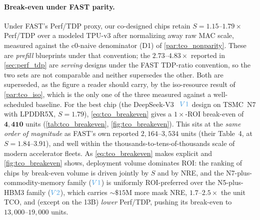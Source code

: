 \paragraph{Break-even under FAST parity.}
Under FAST's Perf/TDP proxy, our co-designed chips retain
$S=1.15\text{--}1.79\times$ Perf/TDP over a modeled TPU-v3 after normalizing away
raw MAC scale, measured against the c0-naive denominator (D1) of
\cref{par:tco_nonparity}. These are \emph{prefill} blueprints under that
convention; the $2.73\text{--}4.83\times$ reported in \cref{sec:perf_tdp} are
\emph{serving} designs under the FAST TDP-ratio convention, so the two sets are
not comparable and neither supersedes the other. Both are superseded, as the
figure a reader should carry, by the iso-resource result of
\cref{par:tco_iso}, which is the only one of the three measured against a
well-scheduled baseline. For the best chip (the DeepSeek-V3~\citep{deepseekv3report}
$\Vone$ design on TSMC~N7 with LPDDR5X, $S=1.79$), \cref{eq:tco_breakeven} gives a
$1\times$-ROI break-even of $\mathbf{4{,}410}$ units (\cref{tab:tco_breakeven},
\cref{fig:tco_breakeven}). This sits at the \emph{same order of magnitude} as
FAST's own reported $2{,}164\text{--}3{,}534$ units (their Table~4, at
$S=1.84\text{--}3.91$), and well within the thousands-to-tens-of-thousands scale
of modern accelerator fleets. As \cref{eq:tco_breakeven} makes explicit and
\cref{fig:tco_breakeven} shows, deployment volume dominates ROI: the ranking of
chips by break-even volume is driven jointly by $S$ and by NRE, and the
N7-plus-commodity-memory family ($\Vone$) is uniformly ROI-preferred over the
N5-plus-HBM3 family ($\Vtwo$), which carries ${\sim}\$15\mathrm{M}$ more mask NRE,
$1.7\text{--}2.5\times$ the unit TCO, and (except on the 13B) \emph{lower}
Perf/TDP, pushing its break-even to $13{,}000\text{--}19{,}000$ units.

